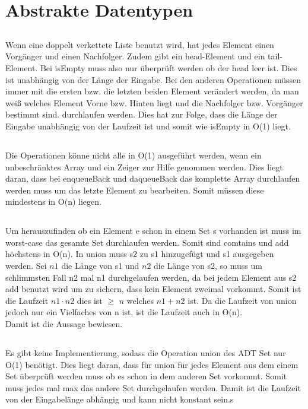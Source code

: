 \section{Abstrakte Datentypen}
\subsection{}
Wenn eine doppelt verkettete Liste benutzt wird, hat jedes Element einen Vorgänger und einen Nachfolger. Zudem gibt ein head-Element und ein tail-Element. Bei isEmpty muss also nur überprüft werden ob der head leer ist. Dies ist unabhängig von der Länge der Eingabe. Bei den anderen Operationen müssen immer mit die ersten bzw. die letzten beiden Element verändert werden, da man weiß welches Element Vorne bzw. Hinten liegt und  die Nachfolger bzw. Vorgänger bestimmt sind.  durchlaufen werden. Dies hat zur Folge, dass die Länge der Eingabe unabhängig von der Laufzeit ist und somit wie isEmpty in O(1) liegt.
\subsection{}
Die Operationen könne nicht alle in O(1) ausgeführt werden, wenn ein unbeschränktes Array und ein Zeiger zur Hilfe genommen werden. Dies liegt daran, dass bei enqueueBack und daqueueBack das komplette Array durchlaufen werden muss um das letzte Element zu bearbeiten. Somit müssen diese mindestens in O(n) liegen.
\subsection{}
Um herauszufinden ob ein Element e schon in einem Set s vorhanden ist muss im worst-case das gesamte Set durchlaufen werden. Somit sind comtains und add höchstens in O(n). In union muss s2 zu s1 hinzugefügt und s1 ausgegeben werden. Sei $n1$ die Länge von s1 und $n2$ die Länge von s2, so muss um schlimmsten Fall n2 mal n1 durchgelaufen werden, da bei jedem Element aus s2 add benutzt wird um zu sichern, dass kein Element zweimal vorkommt. Somit ist die Laufzeit $n1 \cdot n2$ dies ist $\geq$ $n$ welches $n1+n2$ ist. Da die Laufzeit von union jedoch nur ein Vielfaches von n ist, ist die Laufzeit auch in O(n). \\Damit ist die Aussage bewiesen.
\subsection{}
Es gibt keine Implementierung, sodass die Operation union des ADT Set nur O(1) benötigt. Dies liegt daran, dass für union für jedes Element aus dem einem Set überprüft werden muss ob es schon in dem anderen Set vorkommt. Somit muss jedes mal max das andere Set durchgelaufen werden. Damit ist die Laufzeit von der Eingabelänge abhängig und kann nicht konstant sein.s